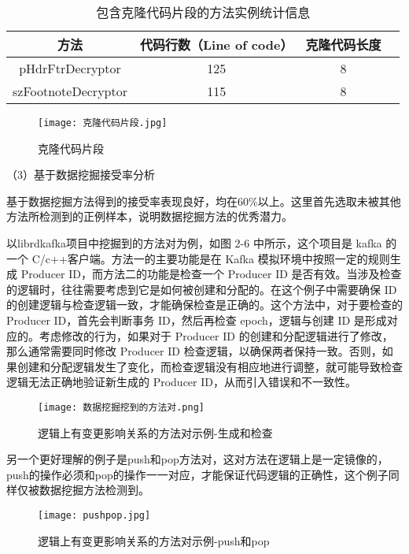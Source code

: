 \clearpage

\begin{table}[htbp]
\caption{包含克隆代码片段的方法实例统计信息}
\vspace{0.5em}\centering\wuhao
\begin{tabular}{cccc}
\toprule
方法 & 代码行数（Line of code）  & 克隆代码长度\\
\midrule
pHdrFtrDecryptor & 125 & 8 \\
szFootnoteDecryptor  & 115 & 8 \\
\bottomrule
\end{tabular}
\end{table}

\begin{figure}[h]
\centering
\texttt{[image: 克隆代码片段.jpg]}
\caption{克隆代码片段}
\end{figure}

（3）基于数据挖掘接受率分析

基于数据挖掘方法得到的接受率表现良好，均在60\%以上。这里首先选取未被其他方法所检测到的正例样本，说明数据挖掘方法的优秀潜力。

以librdkafka项目中挖掘到的方法对为例，如图 2-6 中所示，这个项目是 kafka 的一个 C/c++客户端。方法一的主要功能是在 Kafka 模拟环境中按照一定的规则生成 Producer ID，而方法二的功能是检查一个 Producer ID 是否有效。当涉及检查的逻辑时，往往需要考虑到它是如何被创建和分配的。在这个例子中需要确保 ID 的创建逻辑与检查逻辑一致，才能确保检查是正确的。这个方法中，对于要检查的 Producer ID，首先会判断事务 ID，然后再检查 epoch，逻辑与创建 ID 是形成对应的。考虑修改的行为，如果对于 Producer ID 的创建和分配逻辑进行了修改，那么通常需要同时修改 Producer ID 检查逻辑，以确保两者保持一致。否则，如果创建和分配逻辑发生了变化，而检查逻辑没有相应地进行调整，就可能导致检查逻辑无法正确地验证新生成的 Producer ID，从而引入错误和不一致性。

\begin{figure}[h]
\centering
\texttt{[image: 数据挖掘挖到的方法对.png]}
\caption{逻辑上有变更影响关系的方法对示例-生成和检查}
\end{figure}

另一个更好理解的例子是push和pop方法对，这对方法在逻辑上是一定镜像的，push的操作必须和pop的操作一一对应，才能保证代码逻辑的正确性，这个例子同样仅被数据挖掘方法检测到。

\begin{figure}[h]
\centering
\texttt{[image: pushpop.jpg]}
\caption{逻辑上有变更影响关系的方法对示例-push和pop}
\end{figure}

